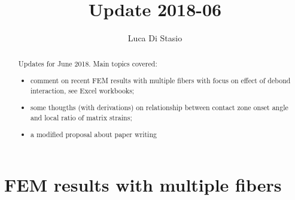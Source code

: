 \documentclass[review]{elsarticle}
\begin{document}
\begin{frontmatter}

\title{Update 2018-06}


\author[nancy,lulea]{Luca Di Stasio}


\address[nancy]{Universit\'e de Lorraine, EEIGM, IJL, 6 Rue Bastien Lepage, F-54010 Nancy, France}
\address[lulea]{Lule\aa\ University of Technology, University Campus, SE-97187 Lule\aa, Sweden}

\begin{abstract}
Updates for June 2018. Main topics covered:
\begin{itemize}
\item comment on recent FEM results with multiple fibers with focus on effect of debond interaction, see Excel workbooks;
\item some thougths (with derivations) on relationship between contact zone onset angle and local ratio of matrix strains;
\item a modified proposal about paper writing
\end{itemize}
\end{abstract}


\end{frontmatter}

\linenumbers

\section{FEM results with multiple fibers}
\end{document}
